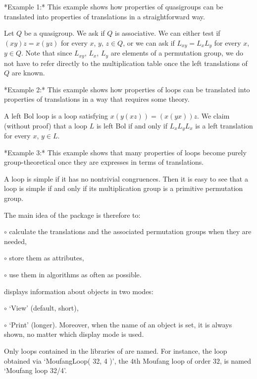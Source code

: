\medskip

*Example 1:* This example shows how properties of quasigroups can be translated
into properties of translations in a straightforward way.

Let $Q$ be a quasigroup. We ask if $Q$ is associative. We can either test if
$(xy)z=x(yz)$ for every $x$, $y$, $z\in Q$, or we can ask if $L_{xy}=L_xL_y$
for every $x$, $y\in Q$. Note that since $L_{xy}$, $L_x$, $L_y$ are elements of
a permutation group, we do not have to refer directly to the multiplication
table once the left translations of $Q$ are known.

*Example 2:* This example shows how properties of loops can be translated into
properties of translations in a way that requires some theory.

A left Bol loop is a loop satisfying $x(y(xz))
= (x(yx))z$. We claim (without proof) that a loop $L$ is left Bol if and only
if $L_xL_yL_x$ is a left translation for every $x$, $y\in L$.

*Example 3:* This example shows that many properties of loops become purely
group-theoretical once they are expresses in terms of translations.

A loop is simple if it has no nontrivial
congruences. Then it is easy to see that a loop is simple if and only if its
multiplication group is a primitive permutation group.

\medskip

The main idea of the package is therefore to:
\beginlist%
\item{$\circ$} calculate the translations and the associated permutation
    groups when they are needed,
\item{$\circ$} store them as attributes,
\item{$\circ$} use them in algorithms as often as possible.
\endlist


{\GAP} displays information about objects in two modes:
\beginlist%
\item{$\circ$}
    `View' (default, short),
\item{$\circ$}
    `Print' (longer).
\endlist
Moreover, when the name of an object is set, it is always shown, no matter
which display mode is used.

Only loops contained in the libraries of {\LOOPS} are named. For instance, the
loop obtained via `MoufangLoop( 32, 4 )', the $4$th Moufang loop of order $32$,
is named `Moufang loop 32/4'.

